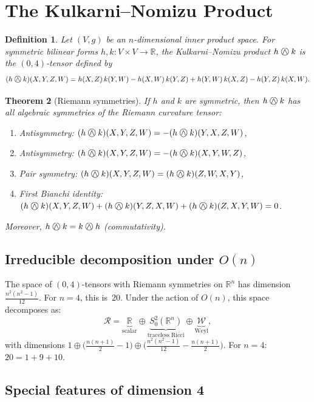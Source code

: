 \documentclass[11pt,a4paper]{article}
\newcommand{\owedge}{\mathbin{%
  \text{%
    \ooalign{%
      \hfil$\wedge$\hfil\cr
      \hfil\raisebox{0.05em}{$\bigcirc$}\hfil\cr
    }%
  }%
}}
\newtheorem{theorem}{Theorem}[section]
\newtheorem{definition}[theorem]{Definition}
\begin{document}
\section{The Kulkarni--Nomizu Product}
\label{sec:kn}

\begin{definition}
Let $(V, g)$ be an $n$-dimensional inner product space. For symmetric
bilinear forms $h, k \colon V \times V \to \mathbb{R}$, the
\emph{Kulkarni--Nomizu product} $h \owedge k$ is the $(0,4)$-tensor
defined by
\[
  (h \owedge k)(X,Y,Z,W) = h(X,Z)\,k(Y,W) - h(X,W)\,k(Y,Z)
    + h(Y,W)\,k(X,Z) - h(Y,Z)\,k(X,W).
\]
\end{definition}

\begin{theorem}[Riemann symmetries]
\label{thm:riemann_sym}
If $h$ and $k$ are symmetric, then $h \owedge k$ has all algebraic
symmetries of the Riemann curvature tensor:
\begin{enumerate}[label=(\roman*)]
  \item Antisymmetry: $(h \owedge k)(X,Y,Z,W) = -(h \owedge k)(Y,X,Z,W)$,
  \item Antisymmetry: $(h \owedge k)(X,Y,Z,W) = -(h \owedge k)(X,Y,W,Z)$,
  \item Pair symmetry: $(h \owedge k)(X,Y,Z,W) = (h \owedge k)(Z,W,X,Y)$,
  \item First Bianchi identity:
    $(h\owedge k)(X,Y,Z,W) + (h\owedge k)(Y,Z,X,W) + (h\owedge k)(Z,X,Y,W) = 0$.
\end{enumerate}
Moreover, $h \owedge k = k \owedge h$ (commutativity).
\end{theorem}

\subsection{Irreducible decomposition under $O(n)$}

The space of $(0,4)$-tensors with Riemann symmetries on $\mathbb{R}^n$
has dimension $\frac{n^2(n^2-1)}{12}$. For $n=4$, this is~$20$.
Under the action of $O(n)$, this space decomposes as:
\[
  \mathcal{R} = \underbrace{\mathbb{R}}_{\text{scalar}} \oplus
  \underbrace{S^2_0(\mathbb{R}^n)}_{\text{traceless Ricci}} \oplus
  \underbrace{\mathcal{W}}_{\text{Weyl}},
\]
with dimensions $1 \oplus \bigl(\frac{n(n+1)}{2}-1\bigr) \oplus
\bigl(\frac{n^2(n^2-1)}{12} - \frac{n(n+1)}{2}\bigr)$.
For $n=4$: $20 = 1 + 9 + 10$.

\subsection{Special features of dimension 4}
\end{document}
